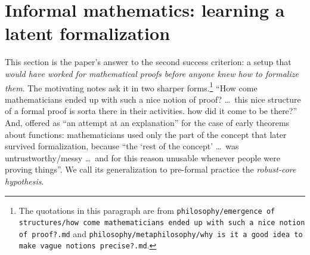 \providecommand{\ACCEPT}{\textsf{ACCEPT}}
\providecommand{\REJECT}{\textsf{REJECT}}
\providecommand{\ESCALATE}{\textsf{ESCALATE}}
\providecommand{\Stg}[2]{\mathrm{St}^{#1}_{#2}}
\providecommand{\Adm}[1]{\mathcal V_{#1}}
\providecommand{\Mint}{\mathbb M}
\providecommand{\Sent}{\mathrm{Sent}}
\providecommand{\Prem}{\mathrm{Prem}}
\providecommand{\Ch}{\mathrm{Ch}}
\providecommand{\Ldim}{\mathrm{Ldim}}
\providecommand{\Mobj}{M_{\mathrm{obj}}}
\providecommand{\Mbag}[1]{M^{(#1)}_{\mathrm{bag}}}
\providecommand{\Comp}{\mathrm{Comp}}
\providecommand{\cov}{\mathrm{cov}}
\providecommand{\MDL}{\mathrm{MDL}}
\providecommand{\REP}{\mathrm{REP}}
\providecommand{\RCH}{\mathrm{RCH}}
\providecommand{\ZF}{\mathsf{ZF}}
\providecommand{\ZFC}{\mathsf{ZFC}}
\providecommand{\IST}{\mathsf{IST}}
\providecommand{\nneg}{{\sim}}

\section{Informal mathematics: learning a latent formalization}\label{sec:informal}

This section is the paper's answer to the second success criterion: a setup that \emph{would have worked for mathematical proofs before anyone knew how to formalize them}. The motivating notes \citep{hanni2026notes} ask it in two sharper forms.\footnote{The quotations in this paragraph are from \texttt{philosophy/\allowbreak emergence of structures/\allowbreak how come mathematicians ended up with such a nice notion of proof?.md} and \texttt{philosophy/\allowbreak metaphilosophy/\allowbreak why is it a good idea to make vague notions precise?.md}.} ``How come mathematicians ended up with such a nice notion of proof? \dots\ this nice structure of a formal proof is sorta there in their activities. how did it come to be there?'' And, offered as ``an attempt at an explanation'' for the case of early theorems about functions: mathematicians used only the part of the concept that later survived formalization, because ``the `rest of the concept' \dots\ was untrustworthy/messy \dots\ and for this reason unusable whenever people were proving things''. We call its generalization to pre-formal practice the \emph{robust-core hypothesis}.

